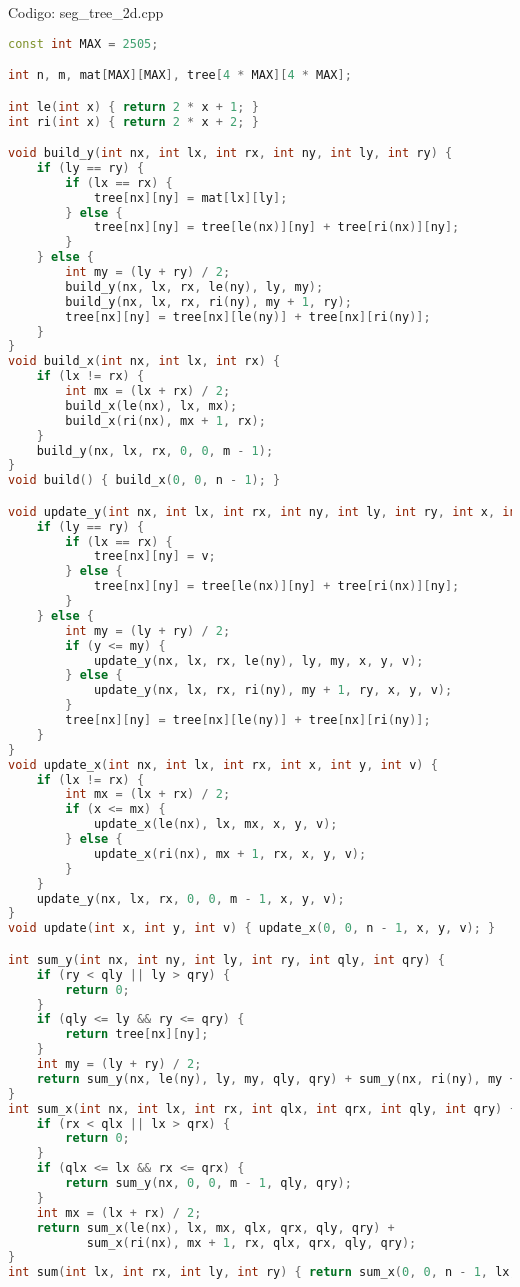 \documentclass[10pt, a4paper, oneside]{book}
\begin{document}
\hfill

Codigo: seg\_tree\_2d.cpp

\begin{lstlisting}[language=C++]
const int MAX = 2505;

int n, m, mat[MAX][MAX], tree[4 * MAX][4 * MAX];

int le(int x) { return 2 * x + 1; }
int ri(int x) { return 2 * x + 2; }

void build_y(int nx, int lx, int rx, int ny, int ly, int ry) {
    if (ly == ry) {
        if (lx == rx) {
            tree[nx][ny] = mat[lx][ly];
        } else {
            tree[nx][ny] = tree[le(nx)][ny] + tree[ri(nx)][ny];
        }
    } else {
        int my = (ly + ry) / 2;
        build_y(nx, lx, rx, le(ny), ly, my);
        build_y(nx, lx, rx, ri(ny), my + 1, ry);
        tree[nx][ny] = tree[nx][le(ny)] + tree[nx][ri(ny)];
    }
}
void build_x(int nx, int lx, int rx) {
    if (lx != rx) {
        int mx = (lx + rx) / 2;
        build_x(le(nx), lx, mx);
        build_x(ri(nx), mx + 1, rx);
    }
    build_y(nx, lx, rx, 0, 0, m - 1);
}
void build() { build_x(0, 0, n - 1); }

void update_y(int nx, int lx, int rx, int ny, int ly, int ry, int x, int y, int v) {
    if (ly == ry) {
        if (lx == rx) {
            tree[nx][ny] = v;
        } else {
            tree[nx][ny] = tree[le(nx)][ny] + tree[ri(nx)][ny];
        }
    } else {
        int my = (ly + ry) / 2;
        if (y <= my) {
            update_y(nx, lx, rx, le(ny), ly, my, x, y, v);
        } else {
            update_y(nx, lx, rx, ri(ny), my + 1, ry, x, y, v);
        }
        tree[nx][ny] = tree[nx][le(ny)] + tree[nx][ri(ny)];
    }
}
void update_x(int nx, int lx, int rx, int x, int y, int v) {
    if (lx != rx) {
        int mx = (lx + rx) / 2;
        if (x <= mx) {
            update_x(le(nx), lx, mx, x, y, v);
        } else {
            update_x(ri(nx), mx + 1, rx, x, y, v);
        }
    }
    update_y(nx, lx, rx, 0, 0, m - 1, x, y, v);
}
void update(int x, int y, int v) { update_x(0, 0, n - 1, x, y, v); }

int sum_y(int nx, int ny, int ly, int ry, int qly, int qry) {
    if (ry < qly || ly > qry) {
        return 0;
    }
    if (qly <= ly && ry <= qry) {
        return tree[nx][ny];
    }
    int my = (ly + ry) / 2;
    return sum_y(nx, le(ny), ly, my, qly, qry) + sum_y(nx, ri(ny), my + 1, ry, qly, qry);
}
int sum_x(int nx, int lx, int rx, int qlx, int qrx, int qly, int qry) {
    if (rx < qlx || lx > qrx) {
        return 0;
    }
    if (qlx <= lx && rx <= qrx) {
        return sum_y(nx, 0, 0, m - 1, qly, qry);
    }
    int mx = (lx + rx) / 2;
    return sum_x(le(nx), lx, mx, qlx, qrx, qly, qry) +
           sum_x(ri(nx), mx + 1, rx, qlx, qrx, qly, qry);
}
int sum(int lx, int rx, int ly, int ry) { return sum_x(0, 0, n - 1, lx, rx, ly, ry); }
\end{lstlisting}
\hfill
\end{document}
